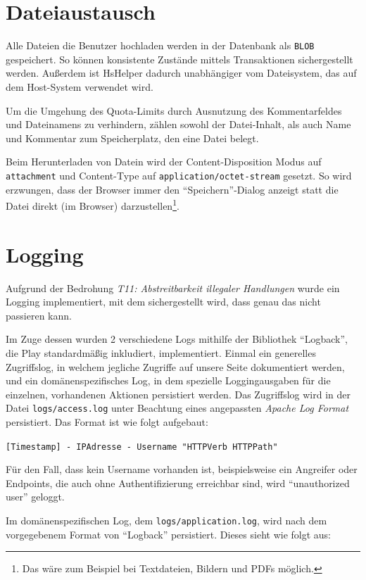 \documentclass[12pt,DIV14,BCOR10mm,a4paper,parskip=half-,headsepline,headinclude,english,ngerman,bibliography=totocnumbered]{scrreprt}
\begin{document}
\section{Dateiaustausch}
Alle Dateien die Benutzer hochladen werden in der Datenbank als \texttt{BLOB} gespeichert. So können konsistente Zustände mittels Transaktionen sichergestellt werden. Außerdem ist HsHelper dadurch unabhängiger vom Dateisystem, das auf dem Host-System verwendet wird.

Um die Umgehung des Quota-Limits durch Ausnutzung des Kommentarfeldes und Dateinamens zu verhindern, zählen sowohl der Datei-Inhalt, als auch Name und Kommentar zum Speicherplatz, den eine Datei belegt.

Beim Herunterladen von Datein wird der Content-Disposition Modus auf \texttt{attachment} und Content-Type auf \texttt{application/octet-stream} gesetzt. So wird erzwungen, dass der Browser immer den \enquote{Speichern}-Dialog anzeigt statt die Datei direkt (im Browser) darzustellen\footnote{Das wäre zum Beispiel bei Textdateien, Bildern und PDFs möglich.}.

\section{Logging}

Aufgrund der Bedrohung \textit{T11: Abstreitbarkeit illegaler Handlungen} wurde ein Logging implementiert, mit dem sichergestellt wird, dass genau das nicht passieren kann.

Im Zuge dessen wurden 2 verschiedene Logs mithilfe der Bibliothek \enquote{Logback}, die Play standardmäßig inkludiert, implementiert.
Einmal ein generelles Zugriffslog, in welchem jegliche Zugriffe auf unsere Seite dokumentiert werden, und ein domänenspezifisches Log, in dem spezielle Loggingausgaben für die einzelnen, vorhandenen Aktionen persistiert werden.
Das Zugriffslog wird in der Datei \texttt{logs/access.log} unter Beachtung eines angepassten \textit{Apache Log Format} persistiert.
Das Format ist wie folgt aufgebaut:

\texttt{[Timestamp] - IPAdresse - Username "HTTPVerb HTTPPath"}

Für den Fall, dass kein Username vorhanden ist, beispielsweise ein Angreifer oder Endpoints, die auch ohne Authentifizierung erreichbar sind, wird \enquote{unauthorized user} geloggt.

Im domänenspezifischen Log, dem \texttt{logs/application.log}, wird nach dem vorgegebenem Format von \enquote{Logback} persistiert.
Dieses sieht wie folgt aus:
\end{document}
